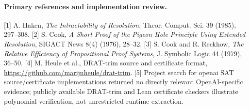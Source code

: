 \documentclass[11pt]{article}
\begin{document}
\paragraph{Primary references and implementation review.}
[1] A. Haken, \emph{The Intractability of Resolution}, Theor. Comput. Sci. 39 (1985), 297--308.
[2] S. Cook, \emph{A Short Proof of the Pigeon Hole Principle Using Extended Resolution}, SIGACT News 8(4) (1976), 28--32.
[3] S. Cook and R. Reckhow, \emph{The Relative Efficiency of Propositional Proof Systems}, J. Symbolic Logic 44 (1979), 36--50.
[4] M. Heule et al., DRAT-trim source and certificate format, \url{https://github.com/marijnheule/drat-trim}.
[5] Project search for openai SAT source/certificate implementations returned no directly relevant OpenAI-specific evidence; publicly available DRAT-trim and Lean certificate checkers illustrate polynomial verification, not unrestricted runtime extraction.
\end{document}
